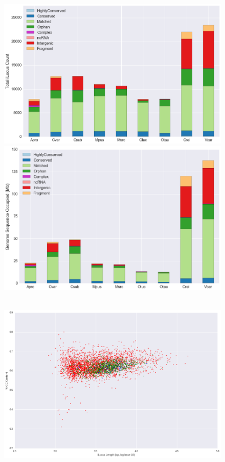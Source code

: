 \begin{figure}[h]
\centering
\includegraphics[width=6in]{Assets/Graphics/iLoci/algae-bd-counts.png} \par
\vspace{50px}
\includegraphics[width=6in]{Assets/Graphics/iLoci/algae-bd-bp.png}
\caption{~}
\label{Fig:GreenAlgaeBreakdown}
\end{figure}

\begin{figure}[h]
\includegraphics[width=6in]{Assets/Graphics/iLoci/crei-breakdown-scatter.png}
\centering
\caption{~}
\label{Fig:CreiBreakdownScatter}
\end{figure}


